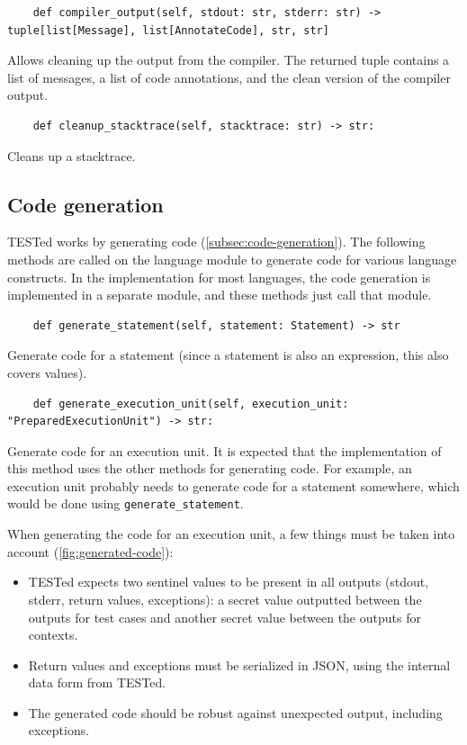 \documentclass[../main]{subfiles}
\begin{document}
\begin{verbatim}
    def compiler_output(self, stdout: str, stderr: str) -> tuple[list[Message], list[AnnotateCode], str, str]
\end{verbatim}

Allows cleaning up the output from the compiler.
The returned tuple contains a list of messages, a list of code annotations, and the clean version of the compiler output.

\begin{verbatim}
    def cleanup_stacktrace(self, stacktrace: str) -> str:
\end{verbatim}

Cleans up a stacktrace.

\subsection{Code generation}\label{subsec:code-generation2}

TESTed works by generating code (\cref{subsec:code-generation}).
The following methods are called on the language module to generate code for various language constructs.
In the implementation for most languages, the code generation is implemented in a separate module, and these methods just call that module.

\begin{verbatim}
    def generate_statement(self, statement: Statement) -> str
\end{verbatim}

Generate code for a statement (since a statement is also an expression, this also covers values).

\begin{verbatim}
    def generate_execution_unit(self, execution_unit: "PreparedExecutionUnit") -> str:
\end{verbatim}

Generate code for an execution unit.
It is expected that the implementation of this method uses the other methods for generating code.
For example, an execution unit probably needs to generate code for a statement somewhere, which would be done using \texttt{generate_statement}.

When generating the code for an execution unit, a few things must be taken into account (\cref{fig:generated-code}):

\begin{itemize}
    \item TESTed expects two sentinel values to be present in all outputs (stdout, stderr, return values, exceptions): a secret value outputted between the outputs for test cases and another secret value between the outputs for contexts.
    \item Return values and exceptions must be serialized in JSON, using the internal data form from TESTed.
    \item The generated code should be robust against unexpected output, including exceptions.
\end{itemize}
\end{document}
